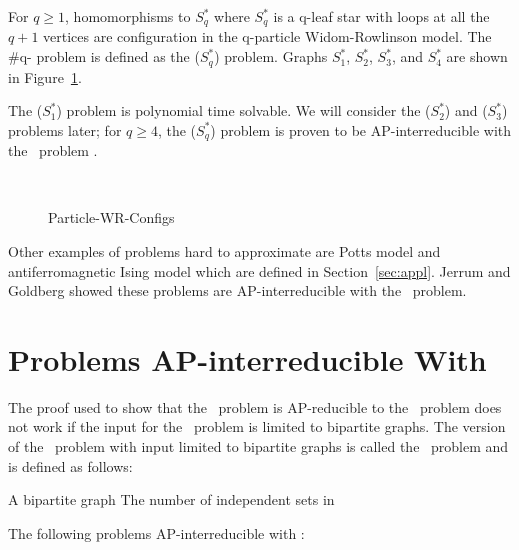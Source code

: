 \begin{example}  \label{exm:particles}
For \(q \ge 1\), homomorphisms to \(S^*_q\) where
\(S^*_q\) is a q-leaf star with loops at all the \(q+1\)
vertices are configuration in the q-particle Widom-Rowlinson model.
The \#q- problem is defined as the \chom(\(S^*_q\)) problem.
Graphs \(S^*_1\), \(S^*_2\), \(S^*_3\), and \(S^*_4\) are shown in Figure~\ref{fig:wrconfigs}.
 
The \chom(\(S^*_1\)) problem is polynomial time solvable.
We will consider the \chom(\(S^*_2\)) and \chom(\(S^*_3\)) problems later;
for \(q \ge 4\), the \chom(\(S^*_q\)) problem is proven to be AP-interreducible
with the \csat\ problem \cite{Leslie03}.
\end{example}

\begin{figure}[h]
\centering 
\subfigure[\(S^*_1\)]{\label{fig:ss1}}\hfill
\subfigure[\(S^*_2\)]{\label{fig:ss2}}\\
\subfigure[\(S^*_3\)]{\label{fig:ss3}}\hfill
\subfigure[\(S^*_4\)]{\label{fig:ss4}}
\caption{Particle-WR-Configs}
\label{fig:wrconfigs}
\end{figure}

Other examples of problems hard to approximate are Potts model
and antiferromagnetic Ising model which are defined in Section~\ref{sec:appl}. 
Jerrum and Goldberg \cite{Goldberg2007} showed these problems are 
AP-interreducible with the \csat\ problem.

\section{Problems AP-interreducible With \cbis}
The proof used to show that the \csat\ problem is AP-reducible to the \cis\ problem does
not work if the input for the \cis\ problem is limited to bipartite graphs.
The version of the \cis\ problem with input limited to bipartite graphs is called
the \cbis\ problem and is defined as follows:

\pnndef%
{A bipartite graph \mG}
{The number of independent sets in \mG}

The following problems AP-interreducible with \cbis:


